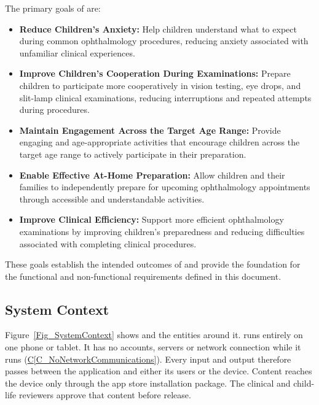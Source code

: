 \documentclass[10pt]{article}
\newcommand{\conref}[1]{\hyperref[#1]{C\ref*{#1}}}
\begin{document}
The primary goals of \progname{} are:

\begin{itemize}
    \item \textbf{Reduce Children's Anxiety:}
    Help children understand what to expect during common ophthalmology
    procedures, reducing anxiety associated with unfamiliar clinical
    experiences.

    \item \textbf{Improve Children's Cooperation During Examinations:}
    Prepare children to participate more cooperatively in vision testing,
    eye drops, and slit-lamp clinical examinations, reducing interruptions and repeated attempts
    during procedures.

    \item \textbf{Maintain Engagement Across the Target Age Range:}
    Provide engaging and age-appropriate activities that encourage
    children across the target age range to actively participate
    in their preparation.

    \item \textbf{Enable Effective At-Home Preparation:}
    Allow children and their families to independently prepare
    for upcoming ophthalmology appointments through accessible
    and understandable activities.

    \item \textbf{Improve Clinical Efficiency:}
    Support more efficient ophthalmology examinations by improving
    children's preparedness and reducing difficulties associated
    with completing clinical procedures.
\end{itemize}

These goals establish the intended outcomes of \progname{} and provide
the foundation for the functional and non-functional requirements
defined in this document.
  
\subsection{System Context}
\label{sec_SystemContext}

Figure~\ref{Fig_SystemContext} shows \progname{} and the entities around it.
\progname{} runs entirely on one phone or tablet. It has no accounts, servers or
network connection while it runs (\conref{C_NoNetworkCommunications}). Every
input and output therefore passes between the application and either its users
or the device. Content reaches the device only through the app store
installation package. The clinical and child-life reviewers approve that
content before release.
\end{document}
